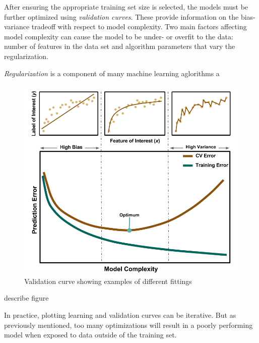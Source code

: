After ensuring the appropriate training set size is selected, the models must
be further optimized using \textit{validation curves}.  These provide
information on the bias-variance tradeoff with respect to model complexity. Two
main factors affecting model complexity can cause the model to be under- or
overfit to the data: number of features in the data set and algorithm
parameters that vary the regularization.

\textit{Regularization} is a component of many machine learning aglorithms a

\begin{figure}[!htb]
  \centering
  \includegraphics[width=1.05\linewidth]{./chapters/litrev/ValidationCurve.png}
  \caption{Validation curve showing examples of different fittings}
  \label{fig:validation}
\end{figure}

describe figure

In practice, plotting learning and validation curves can be iterative. But as
previously mentioned, too many optimizations will result in a poorly performing
model when exposed to data outside of the training set.

